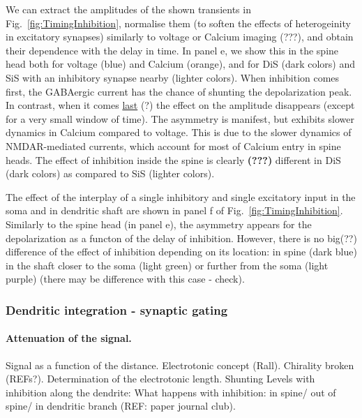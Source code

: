 \documentclass[10pt,letterpaper]{article}
\begin{document}
We can extract the amplitudes of the shown transients in Fig.~\ref{fig:TimingInhibition}, normalise them (to soften the effects of heterogeinity in excitatory synapses) similarly to voltage or Calcium imaging {(???)}, and obtain their dependence with the delay in time. In panel e, we show this in the spine head both for voltage (blue) and Calcium (orange), and for DiS (dark colors) and SiS with an inhibitory synapse nearby (lighter colors). When inhibition comes first, the GABAergic current has the chance of shunting the depolarization peak. In contrast, when it comes \underline{last} (?) the effect on the amplitude disappears (except for a very small window of time). The asymmetry is manifest, but exhibits slower dynamics in Calcium compared to voltage. This is due to the slower dynamics of NMDAR-mediated currents, which account for most of  Calcium entry in spine heads. The effect of inhibition inside the spine is clearly \textbf{(???)} different in DiS (dark colors) as compared to SiS (lighter colors). 

The effect of the interplay of a single inhibitory and single excitatory input in the soma and in dendritic shaft are shown in panel f of Fig.~\ref{fig:TimingInhibition}. Similarly to the spine head (in panel e), the asymmetry appears for the depolarization as a functon of the delay of inhibition. However, there is no big(??) difference of the effect of inhibition depending on its location: in spine (dark blue) in the shaft closer to the soma (light green) or further from the soma   (light purple) (there may be difference with this case - check). 


\subsubsection*{Dendritic integration - synaptic gating}
\paragraph*{Attenuation of the signal.} Signal as a function of the distance. Electrotonic concept (Rall). Chirality broken (REFs?). Determination of the electrotonic length. Shunting Levels with inhibition along the dendrite: What happens with inhibition: in spine/ out of spine/ 
in dendritic branch (REF: paper journal club).
\end{document}
